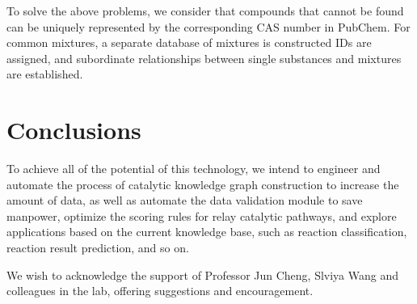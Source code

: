 \documentclass[%
 aip,
 jmp,%
 amsmath,amssymb,
 reprint,%
]{revtex4-2}
\begin{document}
To solve the above problems, we consider that compounds that cannot be found can be uniquely represented by the corresponding CAS number in PubChem. For common mixtures, a separate database of mixtures is constructed IDs are assigned, and subordinate relationships between single substances and mixtures are established.


\section{Conclusions}

To achieve all of the potential of this technology, we intend to engineer and automate the process of catalytic knowledge graph construction to increase the amount of data, as well as automate the data validation module to save manpower, optimize the scoring rules for relay catalytic pathways, and explore applications based on the current knowledge base, such as reaction classification, reaction result prediction, and so on.

\begin{acknowledgments}
We wish to acknowledge the support of Professor Jun Cheng, Slviya Wang and colleagues in the lab, offering suggestions and encouragement.

\end{acknowledgments}

\nocite{*}
\end{document}
